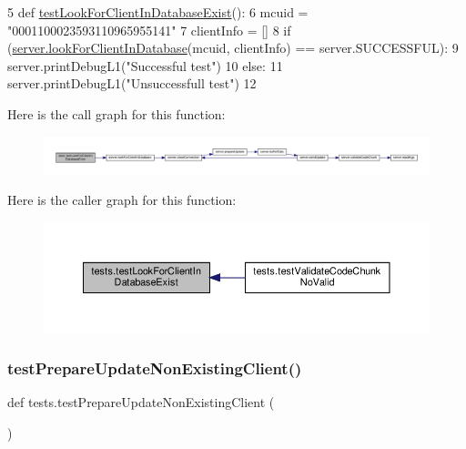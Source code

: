 \begin{DoxyCode}
5 \textcolor{keyword}{def }\hyperlink{namespacetests_ab9d8846c7694143044a37e86e9447600}{testLookForClientInDatabaseExist}():
6      mcuid = \textcolor{stringliteral}{"0001100023593110965955141"}
7      clientInfo = []
8      \textcolor{keywordflow}{if} (\hyperlink{namespaceserver_a998e5671e2ab0c79b9abe44e87e203a0}{server.lookForClientInDatabase}(mcuid, clientInfo) == 
      server.SUCCESSFUL):
9           server.printDebugL1(\textcolor{stringliteral}{"Successful test"})
10      \textcolor{keywordflow}{else}:
11           server.printDebugL1(\textcolor{stringliteral}{"Unsuccessfull test"})
12 
\end{DoxyCode}
Here is the call graph for this function\+:
\nopagebreak
\begin{figure}[H]
\begin{center}
\leavevmode
\includegraphics[width=350pt]{namespacetests_ab9d8846c7694143044a37e86e9447600_cgraph}
\end{center}
\end{figure}
Here is the caller graph for this function\+:
\nopagebreak
\begin{figure}[H]
\begin{center}
\leavevmode
\includegraphics[width=350pt]{namespacetests_ab9d8846c7694143044a37e86e9447600_icgraph}
\end{center}
\end{figure}
\mbox{\label{namespacetests_a1305f09454544d106db05e825d2ae813}} 
\subsubsection{\texorpdfstring{test\+Prepare\+Update\+Non\+Existing\+Client()}{testPrepareUpdateNonExistingClient()}}
{\footnotesize\ttfamily def tests.\+test\+Prepare\+Update\+Non\+Existing\+Client (\begin{DoxyParamCaption}{ }\end{DoxyParamCaption})}


